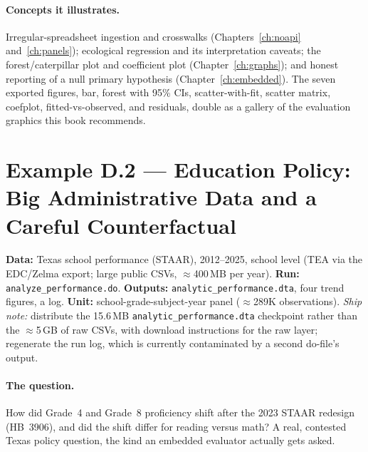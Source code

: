 \documentclass[
    a4paper,
    fontsize=10pt,
    twoside=true,
    numbers=noenddot,
]{kaobook}
\begin{document}
\paragraph{Concepts it illustrates.} Irregular-spreadsheet ingestion and crosswalks (Chapters~\ref{ch:noapi} and~\ref{ch:panels}); ecological regression and its interpretation caveats; the forest/caterpillar plot and coefficient plot (Chapter~\ref{ch:graphs}); and honest reporting of a null primary hypothesis (Chapter~\ref{ch:embedded}). The seven exported figures, bar, forest with 95\% CIs, scatter-with-fit, scatter matrix, coefplot, fitted-vs-observed, and residuals, double as a gallery of the evaluation graphics this book recommends.

\section*{Example D.2 --- Education Policy: Big Administrative Data and a Careful Counterfactual}
\begin{kaobox}[frametitle=Get the files: \texttt{edc-3.0-texas/}]
\textbf{Data:} Texas school performance (STAAR), 2012--2025, school level (TEA via the EDC/Zelma export; large public CSVs, $\approx$400\,MB per year).
\textbf{Run:} \texttt{analyze\_performance.do}. \textbf{Outputs:} \texttt{analytic\_performance.dta}, four trend figures, a log.
\textbf{Unit:} school-grade-subject-year panel ($\approx$289K observations). \emph{Ship note:} distribute the 15.6\,MB \texttt{analytic\_performance.dta} checkpoint rather than the $\approx$5\,GB of raw CSVs, with download instructions for the raw layer; regenerate the run log, which is currently contaminated by a second do-file's output.
\end{kaobox}

\paragraph{The question.} How did Grade~4 and Grade~8 proficiency shift after the 2023 STAAR redesign (HB~3906), and did the shift differ for reading versus math? A real, contested Texas policy question, the kind an embedded evaluator actually gets asked.
\end{document}
